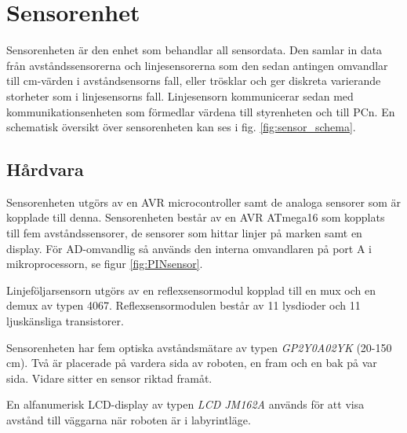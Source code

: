 
\section{Sensorenhet}

Sensorenheten är den enhet som behandlar all sensordata. Den samlar in data från 
avståndssensorerna och linjesensorerna som den sedan antingen omvandlar till 
cm-värden i avståndsensorns fall, eller trösklar och ger diskreta varierande storheter 
som i linjesensorns fall. Linjesensorn kommunicerar sedan med kommunikationsenheten
som förmedlar värdena till styrenheten och till PCn. En schematisk översikt över sensorenheten 
kan ses i fig. \ref{fig:sensor_schema}.


\subsection{Hårdvara}
Sensorenheten utgörs av en AVR microcontroller samt de analoga sensorer som är kopplade till denna. Sensorenheten består av en AVR ATmega16 som 
kopplats till fem avståndssensorer, de sensorer som hittar linjer på marken samt en display. För AD-omvandlig så används den interna omvandlaren på port A
i mikroprocessorn, se figur \ref{fig:PINsensor}. 

Linjeföljarsensorn utgörs av en reflexsensormodul kopplad till en mux och en demux av typen 4067. Reflexsensormodulen består av 11 lysdioder och 11 ljuskänsliga transistorer. 

Sensorenheten har fem optiska avståndsmätare av typen \emph{GP2Y0A02YK} (20-150 cm). Två är placerade på vardera sida av roboten, en fram och en bak på var sida. Vidare sitter en sensor riktad framåt. 

En alfanumerisk LCD-display av typen \emph{LCD JM162A} används för att visa avstånd till väggarna när roboten är i labyrintläge. 


